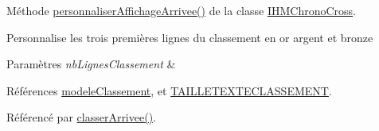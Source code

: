 Méthode \hyperlink{class_i_h_m_chrono_cross_a41c2ff49d25069f8dfa2a7b3d0606d38}{personnaliser\+Affichage\+Arrivee()} de la classe \hyperlink{class_i_h_m_chrono_cross}{I\+H\+M\+Chrono\+Cross}. 

Personnalise les trois premières lignes du classement en or argent et bronze 
\begin{DoxyParams}{Paramètres}
{\em nb\+Lignes\+Classement} & \\
\hline
\end{DoxyParams}


Références \hyperlink{class_i_h_m_chrono_cross_ac25c95280801f36c43a1c41cf2fa253e}{modele\+Classement}, et \hyperlink{ihmchronocross_8h_ad9c2b9995bc14e73ab20cdd74252126d}{T\+A\+I\+L\+L\+E\+T\+E\+X\+T\+E\+C\+L\+A\+S\+S\+E\+M\+E\+NT}.



Référencé par \hyperlink{class_i_h_m_chrono_cross_a5e9b561659ba63d2739335b8ab432cbf}{classer\+Arrivee()}.



